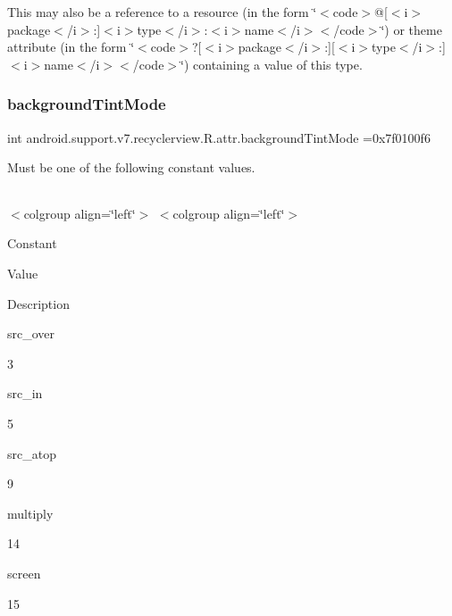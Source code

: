 This may also be a reference to a resource (in the form \char`\"{}$<$code$>$@\mbox{[}$<$i$>$package$<$/i$>$\+:\mbox{]}$<$i$>$type$<$/i$>$\+:$<$i$>$name$<$/i$>$$<$/code$>$\char`\"{}) or theme attribute (in the form \char`\"{}$<$code$>$?\mbox{[}$<$i$>$package$<$/i$>$\+:\mbox{]}\mbox{[}$<$i$>$type$<$/i$>$\+:\mbox{]}$<$i$>$name$<$/i$>$$<$/code$>$\char`\"{}) containing a value of this type. \mbox{\label{classandroid_1_1support_1_1v7_1_1recyclerview_1_1R_1_1attr_af5c038ccddbb7cc12f94417e71171b99}} 
\subsubsection{\texorpdfstring{background\+Tint\+Mode}{backgroundTintMode}}
{\footnotesize\ttfamily int android.\+support.\+v7.\+recyclerview.\+R.\+attr.\+background\+Tint\+Mode =0x7f0100f6\hspace{0.3cm}{\ttfamily [static]}}

Must be one of the following constant values.

\tabulinesep=1mm
\begin{longtabu} spread 0pt [c]{*{0}{|X[-1]}|}
\hline
\end{longtabu}
$<$colgroup align=\char`\"{}left\char`\"{}$>$ $<$colgroup align=\char`\"{}left\char`\"{}$>$ 

Constant

Value

Description 

{\ttfamily src\+\_\+over}

3

{\ttfamily src\+\_\+in}

5

{\ttfamily src\+\_\+atop}

9

{\ttfamily multiply}

14

{\ttfamily screen}

15\mbox{\label{classandroid_1_1support_1_1v7_1_1recyclerview_1_1R_1_1attr_a9b707745765ae88ff167b1f3ad84fb04}} 
